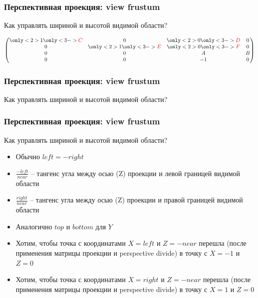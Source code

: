 \documentclass[10pt]{beamer}
\begin{document}
\begin{frame}[fragile]
\frametitle{Перспективная проекция: view frustum}
Как управлять шириной и высотой видимой области?
\pause
\begin{center}
\begin{math}
\begin{pmatrix}
\only<2>{1}\only<3->{\color{red}C} & 0 & \only<2>{0}\only<3->{\color{red}D} & 0 \\
0 & \only<2>{1}\only<3->{\color{red}E} & \only<2>{0}\only<3->{\color{red}F} & 0 \\
0 & 0 & A & B \\
0 & 0 & -1 & 0
\end{pmatrix}
\end{math}
\end{center}
\end{frame}

\begin{frame}[fragile]
\frametitle{Перспективная проекция: view frustum}
Как управлять шириной и высотой видимой области?
\end{frame}

\begin{frame}[fragile]
\frametitle{Перспективная проекция: view frustum}
Как управлять шириной и высотой видимой области?
\begin{itemize}
\item Обычно \(left = -right\)
\pause
\item \begin{math}\frac{-left}{near}\end{math} -- тангенс угла между осью (Z) проекции и левой границей видимой области
\item \begin{math}\frac{right}{near}\end{math} -- тангенс угла между осью (Z) проекции и правой границей видимой области
\pause
\item Аналогично \(top\) и \(bottom\) для \(Y\)
\pause
\item Хотим, чтобы точка с координатами \(X = left\) и \(Z = -near\) перешла (после применения матрицы проекции и perspective divide) в точку с \(X = -1\) и \(Z = 0\)
\item Хотим, чтобы точка с координатами \(X = right\) и \(Z = -near\) перешла (после применения матрицы проекции и perspective divide) в точку с \(X = 1\) и \(Z = 0\)
\end{itemize}
\end{frame}
\end{document}
